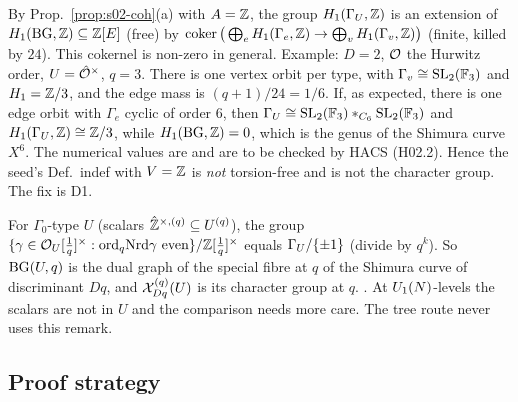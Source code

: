 \begin{remark}[torsion in $H_1(\GU,\Z)$]\label{rem:s02-torsion}
By Prop.~\ref{prop:s02-coh}(a) with $A=\mathbb{Z}$, the group $H_1(\GU,\Z)$ is an extension of
$H_1(\mathrm{BG},\mathbb{Z})\subseteq\mathbb{Z}[E]$ (free) by $\operatorname{coker}\big(\bigoplus_eH_1(\Gamma_e,\mathbb{Z})\to\bigoplus_vH_1(\Gamma_v,\mathbb{Z})\big)$
(finite, killed by $24$). This cokernel is non-zero in general. Example: $D=2$, $\mathcal{O}$ the Hurwitz order,
$U=\hat{\mathcal{O}}^\times$, $q=3$. There is one vertex orbit per type, with $\Gamma_v\cong\mathrm{SL}_2(\mathbb{F}_3)$ and
$H_1=\mathbb{Z}/3$, and the edge mass is $(q+1)/24=1/6$. If, as expected, there is one edge orbit with $\Gamma_e$ cyclic of order $6$, then
$\Gamma_U\cong\mathrm{SL}_2(\mathbb{F}_3)*_{C_6}\mathrm{SL}_2(\mathbb{F}_3)$ and $H_1(\Gamma_U,\mathbb{Z})\cong\mathbb{Z}/3$, while $H_1(\mathrm{BG},\mathbb{Z})=0$, which is the genus
of the Shimura curve $X^6$. The numerical values are \stsketch{} and are to be checked by HACS (H02.2). Hence
the seed's Def.~indef with $V=\mathbb{Z}$ is \emph{not} torsion-free and is not the character group. The fix is D1.
\end{remark}

\begin{remark}\label{rem:s02-CD}
For $\Gamma_0$-type $U$ (scalars $\hat{\mathbb{Z}}^{\times,(q)}\subseteq U^{(q)}$), the group
$\{\gamma\in\mathcal{O}_U[\frac1q]^\times:\mathrm{ord}_q\mathrm{Nrd}\gamma\text{ even}\}/\mathbb{Z}[\frac1q]^\times$ equals $\Gamma_U/\{\pm1\}$ (divide by
$q^{k}$). So $\mathrm{BG}(U,q)$ is the dual graph of the special fibre at $q$ of the Shimura curve of discriminant $Dq$,
and $\mathcal{X}^{(q)}_{Dq}(U)$ is its character group at $q$. \stcited{}
. At $U_1(N)$-levels the scalars are not in $U$ and the comparison needs more care. The tree
route never uses this remark.
\end{remark}

\subsection{Proof strategy}\label{ss:s02-proofs}
